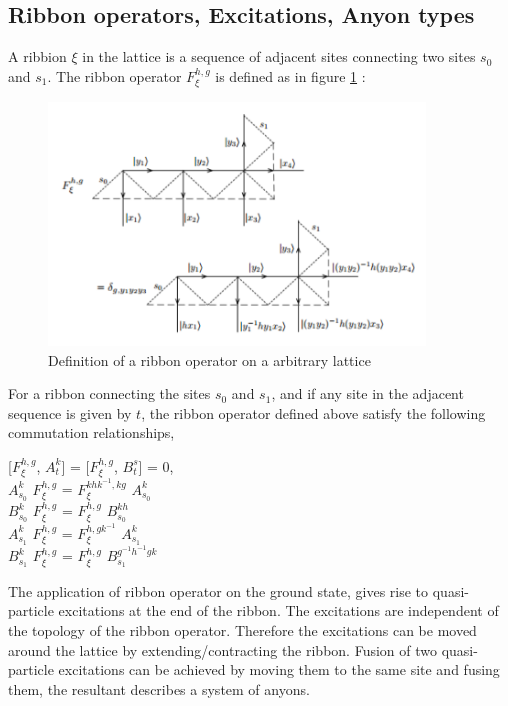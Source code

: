 \subsection{Ribbon operators, Excitations, Anyon types}
    A ribbion $\xi$ in the lattice is a sequence of adjacent sites connecting two sites $s_{0}$ and $s_{1}$.
The ribbon operator $F^{h,g}_{\xi}$ is defined as in figure \ref{fig:ribbon} : \\
\begin{figure}
\centering
\includegraphics[width=10cm]{Ribbon_operator.pdf}
\caption[Definition of Ribbon operator]{Definition of a ribbon operator on a arbitrary lattice}
\centering
\label{fig:ribbon}
\end{figure}

For a ribbon connecting the sites $s_{0}$ and $s_{1}$, and if any site in the adjacent sequence is given by $t$,
the ribbon operator defined above satisfy the following commutation relationships,
\begin{center}
      [$F^{h,g}_{\xi}$, $A^{k}_{t}$] = [$F^{h,g}_{\xi}$, $B^{s}_{t}$] = 0, \\ 
      $A^{k}_{s_{0}}$ $F^{h,g}_{\xi}$ = $F^{khk^{-1},kg}_{\xi}$ $A^{k}_{s_{0}}$ \\
      $B^{k}_{s_{0}}$ $F^{h,g}_{\xi}$ = $F^{h,g}_{\xi}$ $B^{kh}_{s_{0}}$ \\
      $A^{k}_{s_{1}}$ $F^{h,g}_{\xi}$ = $F^{h,gk^{-1}}_{\xi}$ $A^{k}_{s_{1}}$ \\
      $B^{k}_{s_{1}}$ $F^{h,g}_{\xi}$ = $F^{h,g}_{\xi}$ $B^{g^{-1}h^{-1}gk}_{s_{1}}$
\end{center}

The application of ribbon operator on the ground state, gives rise to quasi-particle excitations at the end of the ribbon. The excitations are independent 
of the topology of the ribbon operator. Therefore the excitations can be moved around the lattice by extending/contracting the ribbon. Fusion of two quasi-particle
excitations can be achieved by moving them to the same site and fusing them, the resultant describes a system of anyons.

